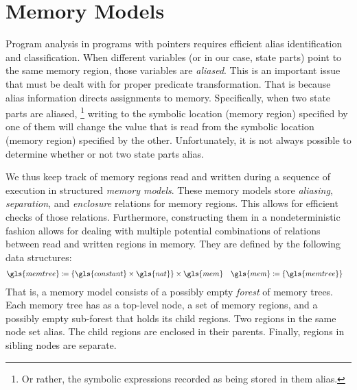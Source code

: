 \section{Memory Models}\label{sec:memory-models}
Program analysis
in programs with pointers
requires efficient alias identification and classification.
When different variables
(or in our case, state parts)
point to the same memory region, those variables are \emph{aliased}.
This is an important issue that must be dealt with for proper predicate transformation.
That is because alias information directs assignments to memory.
Specifically, when two state parts are aliased,%
\footnote{Or rather, the symbolic expressions
  recorded as being stored in them alias.}
writing to the symbolic location (memory region) specified by one of them will change the value that is read from the symbolic location (memory region) specified by the other.
Unfortunately, it is not always possible to determine whether or not
two state parts alias.

We thus keep track of memory regions read and written during a sequence of execution in structured \emph{memory models}.%
%
These memory models store \emph{aliasing}, \emph{separation},%
and \emph{enclosure}
relations for memory regions.
This allows for efficient checks of those relations.
Furthermore, constructing them in a nondeterministic
fashion allows for dealing with multiple potential combinations of relations
between read and written regions in memory.
They are defined by the following data structures:
\begin{align*}
  \gls{memtree} &\coloneqq
  \{\gls{constant}\times\gls{nat}\}\times\gls{mem}
  &
  \gls{mem} &\coloneqq \{\gls{memtree}\}
\end{align*}
That is,
a memory model consists of a possibly empty \emph{forest} of memory trees.%
%
Each memory tree has as a top-level node,
a set of memory regions,
and a possibly empty sub-forest that holds its child regions.
Two regions in the same node set alias.
The child regions are enclosed in their parents.
Finally, regions in sibling nodes are separate.

